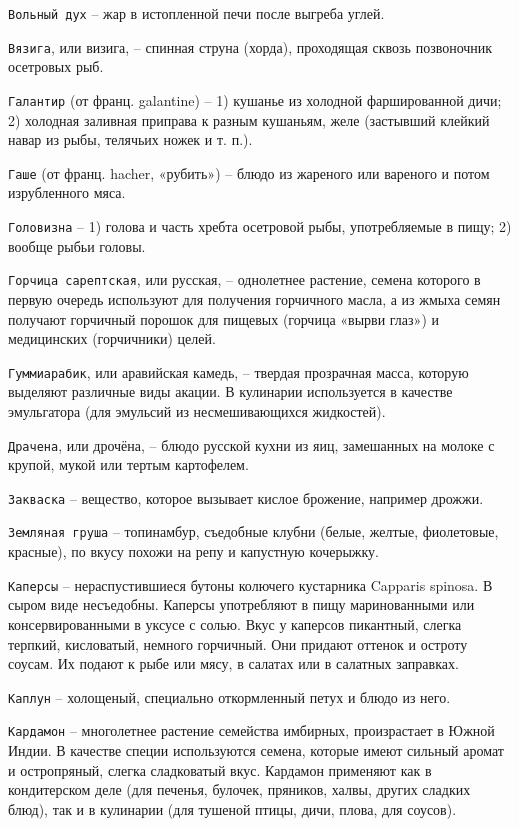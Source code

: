 {\tt Вольный дух} – жар в истопленной печи после выгреба углей. 

{\tt Вязига}, или визига, – спинная струна (хорда), проходящая сквозь позвоночник осетровых рыб.

{\tt Галантир} (от франц. galantine) – 1) кушанье из холодной фаршированной дичи; 2) холодная заливная приправа к разным кушаньям, желе (застывший клейкий навар из рыбы, телячьих ножек и т. п.). 

{\tt Гаше} (от франц. hacher, «рубить») – блюдо из жареного или вареного и потом изрубленного мяса.

{\tt Головизна} – 1) голова и часть хребта осетровой рыбы, употребляемые в пищу; 2) вообще рыбьи головы.

{\tt Горчица сарептская}, или русская, – однолетнее растение, семена которого в первую очередь используют для получения горчичного масла, а из жмыха семян получают горчичный порошок для пищевых (горчица «вырви глаз») и медицинских (горчичники) целей. 

{\tt Гуммиарабик}, или аравийская камедь, – твердая прозрачная масса, которую выделяют различные виды акации. В кулинарии используется в качестве эмульгатора (для эмульсий из несмешивающихся жидкостей).

{\tt Драчена}, или дрочёна, – блюдо русской кухни из яиц, замешанных на молоке с крупой, мукой или тертым картофелем.

{\tt Закваска} – вещество, которое вызывает кислое брожение, например дрожжи. 

{\tt Земляная груша} – топинамбур, съедобные клубни (белые, желтые, фиолетовые, красные), по вкусу похожи на репу и капустную кочерыжку.

{\tt Каперсы} – нераспустившиеся бутоны колючего кустарника Capparis spinosa. В сыром виде несъедобны. Каперсы употребляют в пищу маринованными или консервированными в уксусе с солью. Вкус у каперсов пикантный, слегка терпкий, кисловатый, немного горчичный. Они придают оттенок и остроту соусам. Их подают к рыбе или мясу, в салатах или в салатных заправках.

{\tt Каплун} – холощеный, специально откормленный петух и блюдо из него.

{\tt Кардамон} – многолетнее растение семейства имбирных, произрастает в Южной Индии. В качестве специи используются семена, которые имеют сильный аромат и остропряный, слегка сладковатый вкус. Кардамон применяют как в кондитерском деле (для печенья, булочек, пряников, халвы, других сладких блюд), так и в кулинарии (для тушеной птицы, дичи, плова, для соусов).

